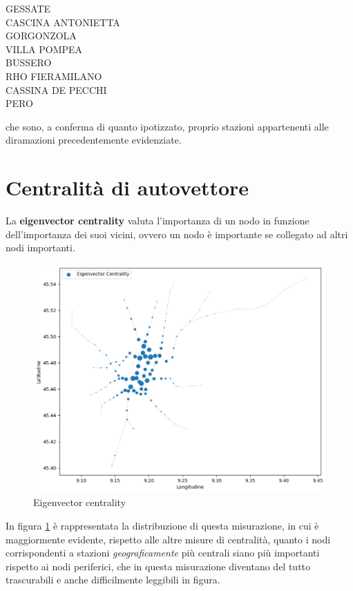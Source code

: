 \begin{center}
GESSATE \\
CASCINA ANTONIETTA \\
GORGONZOLA \\
VILLA POMPEA \\
BUSSERO \\
RHO FIERAMILANO \\
CASSINA DE PECCHI \\
PERO \\
\end{center}

che sono, a conferma di quanto ipotizzato, proprio stazioni appartenenti alle diramazioni precedentemente evidenziate.

\section{Centralità di autovettore}
La \textbf{eigenvector centrality} valuta l'importanza di un nodo in funzione dell'importanza dei suoi vicini, ovvero un nodo è importante se collegato ad altri nodi importanti.

\vspace{1em}
\begin{figure}[h!]
    \centering
    \includegraphics[width=0.8\linewidth]{Immagini//Capitoli//cap4/eigen_centr.png}
    \caption{Eigenvector centrality}
    \label{fig: Eigenvector Centrality}
\end{figure}
\vspace{1em}

In figura \ref{fig: Eigenvector Centrality} è rappresentata la distribuzione di questa misurazione, in cui è maggiormente evidente, rispetto alle altre misure di centralità, quanto i nodi corrispondenti a stazioni \textit{geograficamente} più centrali siano più importanti rispetto ai nodi periferici, che in questa misurazione diventano del tutto trascurabili e anche difficilmente leggibili in figura.